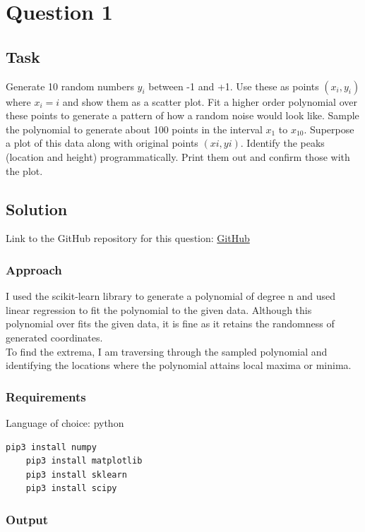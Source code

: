 \section{Question 1}

\subsection{Task}
Generate 10 random numbers $y_i$ between -1 and +1. Use these as points $\left(x_i,y_i\right)$ where $x_i=i$ and show them as a scatter plot. Fit a higher order polynomial over these points to generate a pattern of how a random noise would look like. Sample the polynomial to generate about 100 points in the interval $x_1$ to $x_{10}$. Superpose a plot of this data along with original points $\left(xi,yi\right)$.  Identify the peaks (location and height) programmatically. Print them out and confirm those with the plot.

\subsection{Solution}

Link to the GitHub repository for this question: \href{https://github.com/Xerefic/MM2090-Solutions/tree/master/Final_Assignment/question_1}{GitHub}

\subsubsection{Approach}
I used the scikit-learn library to generate a polynomial of degree n and used linear regression to fit the polynomial to the given data. Although this polynomial over fits the given data, it is fine as it retains the randomness of generated coordinates. \\
To find the extrema, I am traversing through the sampled polynomial and identifying the locations where the polynomial attains local maxima or minima. 

\subsubsection{Requirements}
Language of choice: python
\begin{lstlisting}[language=bash]
	pip3 install numpy
	pip3 install matplotlib
	pip3 install sklearn
	pip3 install scipy
\end{lstlisting}

\subsubsection{Output}


